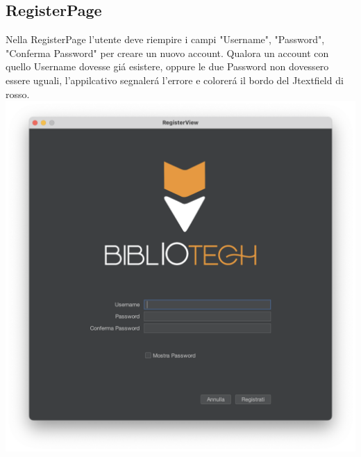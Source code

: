 \subsection{RegisterPage}
Nella RegisterPage l'utente deve riempire i campi "Username", "Password", "Conferma Password" per creare un
nuovo account. Qualora un account con quello Username dovesse gi\'a esistere, oppure le due Password non dovessero
essere uguali, l'appilcativo segnaler\'a l'errore e colorer\'a il bordo del Jtextfield di rosso.
\includegraphics[scale=0.25, center]{Immagini/Schermate/Login_Register/RegisterPage.png}

